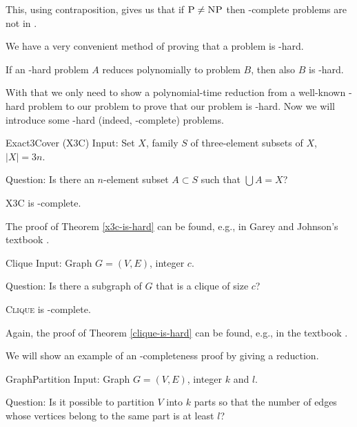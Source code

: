 This, using contraposition, gives us that if $\text{\textsc{P}} \neq \text{\textsc{NP}}$ then \np-complete problems are not in \p.

We have a very convenient method of proving that a problem is \np-hard.

\begin{rmrk}
If an \np-hard problem $A$ reduces polynomially to problem $B$, then also $B$ is \np-hard.
\end{rmrk}

With that we only need to show a polynomial-time reduction from a well-known \np-hard problem
to our problem to prove that our problem is \np-hard.
Now we will introduce some \np-hard (indeed, \np-complete) problems.

\begin{problem}{Exact3Cover (X3C)}
	Input: Set $X$, family $S$ of three-element subsets of $X$, $\vert{X}\vert = 3n$.

	Question: Is there an $n$-element subset $A \subset S$ such that $\bigcup A = X$?
\end{problem}

\begin{thm} \label{x3c-is-hard}
\textsc{X3C} is \np-complete.
\end{thm}

The proof of Theorem \ref{x3c-is-hard} can be found, e.g., in
Garey and Johnson's textbook \cite{computersandintractability}.

\begin{problem}{Clique}
    Input: Graph $G = (V, E)$, integer $c$.

    Question: Is there a subgraph of $G$ that is a clique of size $c$?
\end{problem}

\begin{thm} \label{clique-is-hard}
\textsc{Clique} is \np-complete.
\end{thm}

Again, the proof of Theorem \ref{clique-is-hard} can be found, e.g.,
in the textbook \cite{computersandintractability}.


We will show an example of an \np-completeness proof by giving a reduction.

\begin{problem}{GraphPartition}
Input: Graph $G = (V, E)$, integer $k$ and $l$.

Question: Is it possible to partition $V$ into $k$ parts so that the number of edges
whose vertices belong to the same part is at least $l$?
\end{problem}

